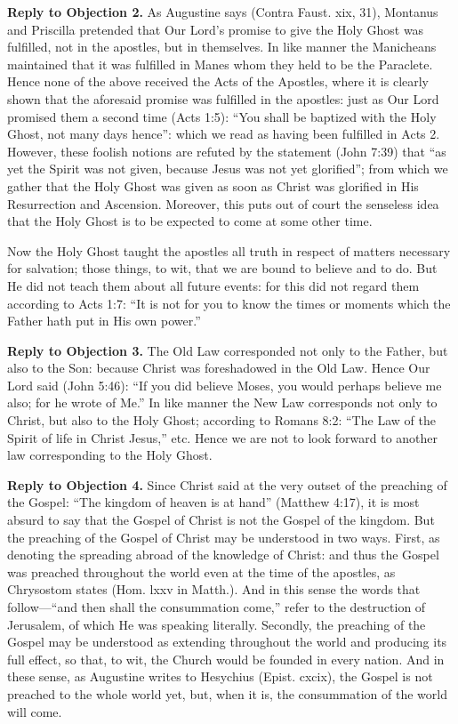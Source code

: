 \textbf{Reply to Objection 2.} As Augustine says (Contra Faust. xix, 31), Montanus and Priscilla pretended that Our Lord's promise to give the Holy Ghost was fulfilled, not in the apostles, but in themselves. In like manner the Manicheans maintained that it was fulfilled in Manes whom they held to be the Paraclete. Hence none of the above received the Acts of the Apostles, where it is clearly shown that the aforesaid promise was fulfilled in the apostles: just as Our Lord promised them a second time (Acts 1:5): ``You shall be baptized with the Holy Ghost, not many days hence'': which we read as having been fulfilled in Acts 2. However, these foolish notions are refuted by the statement (John 7:39) that ``as yet the Spirit was not given, because Jesus was not yet glorified''; from which we gather that the Holy Ghost was given as soon as Christ was glorified in His Resurrection and Ascension. Moreover, this puts out of court the senseless idea that the Holy Ghost is to be expected to come at some other time.

Now the Holy Ghost taught the apostles all truth in respect of matters necessary for salvation; those things, to wit, that we are bound to believe and to do. But He did not teach them about all future events: for this did not regard them according to Acts 1:7: ``It is not for you to know the times or moments which the Father hath put in His own power.''

\textbf{Reply to Objection 3.} The Old Law corresponded not only to the Father, but also to the Son: because Christ was foreshadowed in the Old Law. Hence Our Lord said (John 5:46): ``If you did believe Moses, you would perhaps believe me also; for he wrote of Me.'' In like manner the New Law corresponds not only to Christ, but also to the Holy Ghost; according to Romans 8:2: ``The Law of the Spirit of life in Christ Jesus,'' etc. Hence we are not to look forward to another law corresponding to the Holy Ghost.

\textbf{Reply to Objection 4.} Since Christ said at the very outset of the preaching of the Gospel: ``The kingdom of heaven is at hand'' (Matthew 4:17), it is most absurd to say that the Gospel of Christ is not the Gospel of the kingdom. But the preaching of the Gospel of Christ may be understood in two ways. First, as denoting the spreading abroad of the knowledge of Christ: and thus the Gospel was preached throughout the world even at the time of the apostles, as Chrysostom states (Hom. lxxv in Matth.). And in this sense the words that follow—``and then shall the consummation come,'' refer to the destruction of Jerusalem, of which He was speaking literally. Secondly, the preaching of the Gospel may be understood as extending throughout the world and producing its full effect, so that, to wit, the Church would be founded in every nation. And in these sense, as Augustine writes to Hesychius (Epist. cxcix), the Gospel is not preached to the whole world yet, but, when it is, the consummation of the world will come.

